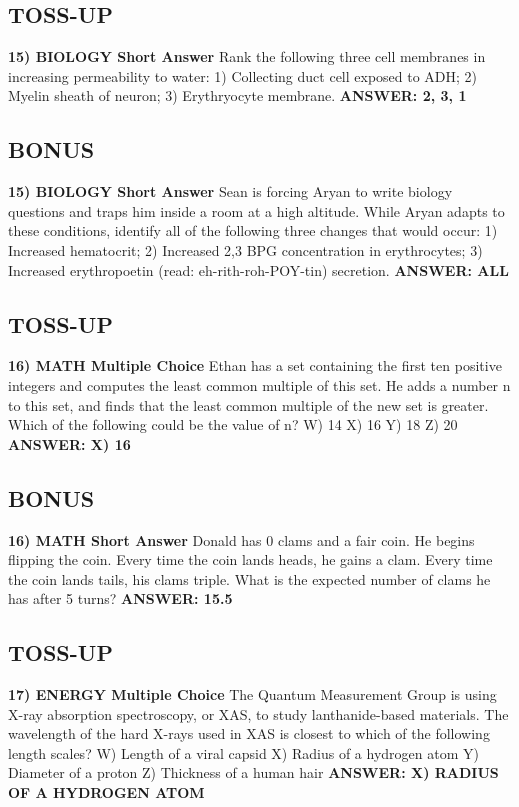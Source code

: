 \documentclass{article}
\begin{document}
\subsection*{TOSS-UP}
\textbf{15) BIOLOGY Short Answer} Rank the following three cell membranes in increasing permeability to water: 1) Collecting duct cell exposed to ADH; 2) Myelin sheath of neuron; 3) Erythryocyte membrane.
\newline
\textbf{ANSWER: 2, 3, 1}

\subsection*{BONUS}
\textbf{15) BIOLOGY Short Answer} Sean is forcing Aryan to write biology questions and traps him inside a room at a high altitude. While Aryan adapts to these conditions, identify all of the following three changes that would occur: 1) Increased hematocrit; 2) Increased 2,3 BPG concentration in erythrocytes; 3) Increased erythropoetin (read: eh-rith-roh-POY-tin) secretion.
\newline
\textbf{ANSWER: ALL}

\subsection*{TOSS-UP}
\textbf{16) MATH Multiple Choice} Ethan has a set containing the first ten positive integers and computes the least common multiple of this set. He adds a number n to this set, and finds that the least common multiple of the new set is greater. Which of the following could be the value of n?
\newline
W) 14
\newline
X) 16
\newline
Y) 18
\newline
Z) 20
\newline
\textbf{ANSWER: X) 16}

\subsection*{BONUS}
\textbf{16) MATH Short Answer} Donald has 0 clams and a fair coin. He begins flipping the coin. Every time the coin lands heads, he gains a clam. Every time the coin lands tails, his clams triple. What is the expected number of clams he has after 5 turns?
\newline
\textbf{ANSWER: 15.5}

\subsection*{TOSS-UP}
\textbf{17) ENERGY Multiple Choice} The Quantum Measurement Group is using X-ray absorption spectroscopy, or XAS, to study lanthanide-based materials. The wavelength of the hard X-rays used in XAS is closest to which of the following length scales?
\newline
W) Length of a viral capsid
\newline
X) Radius of a hydrogen atom
\newline
Y) Diameter of a proton
\newline
Z) Thickness of a human hair
\newline
\textbf{ANSWER: X) RADIUS OF A HYDROGEN ATOM}
\end{document}
